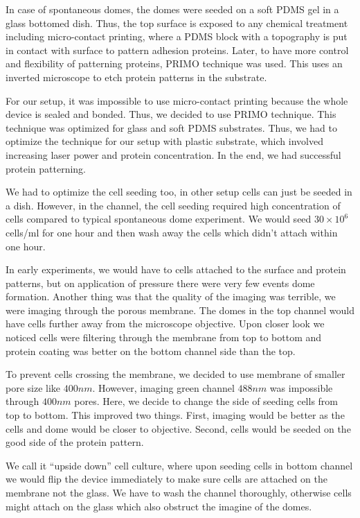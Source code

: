 In case of spontaneous domes, the domes were seeded on a soft PDMS gel
in a glass bottomed dish. Thus, the top surface is exposed to any
chemical treatment including micro-contact printing, where a PDMS block
with a topography is put in contact with surface to pattern adhesion
proteins. Later, to have more control and flexibility of patterning
proteins, PRIMO technique was used. This uses an inverted microscope to
etch protein patterns in the substrate.

For our setup, it was impossible to use micro-contact printing because
the whole device is sealed and bonded. Thus, we decided to use PRIMO
technique. This technique was optimized for glass and soft PDMS
substrates. Thus, we had to optimize the technique for our setup with
plastic substrate, which involved increasing laser power and protein
concentration. In the end, we had successful protein patterning.

We had to optimize the cell seeding too, in other setup cells can just
be seeded in a dish. However, in the channel, the cell seeding required
high concentration of cells compared to typical spontaneous dome
experiment. We would seed \(30\times 10^6\) cells/ml for one hour and
then wash away the cells which didn't attach within one hour.

In early experiments, we would have to cells attached to the surface and
protein patterns, but on application of pressure there were very few
events dome formation. Another thing was that the quality of the imaging
was terrible, we were imaging through the porous membrane. The domes in
the top channel would have cells further away from the microscope
objective. Upon closer look we noticed cells were filtering through the
membrane from top to bottom and protein coating was better on the bottom
channel side than the top.

To prevent cells crossing the membrane, we decided to use membrane of
smaller pore size like \(400nm\). However, imaging green channel
\(488nm\) was impossible through \(400nm\) pores. Here, we decide to
change the side of seeding cells from top to bottom. This improved two
things. First, imaging would be better as the cells and dome would be
closer to objective. Second, cells would be seeded on the good side of
the protein pattern.

We call it ``upside down'' cell culture, where upon seeding cells in
bottom channel we would flip the device immediately to make sure cells
are attached on the membrane not the glass. We have to wash the channel
thoroughly, otherwise cells might attach on the glass which also
obstruct the imagine of the domes.

